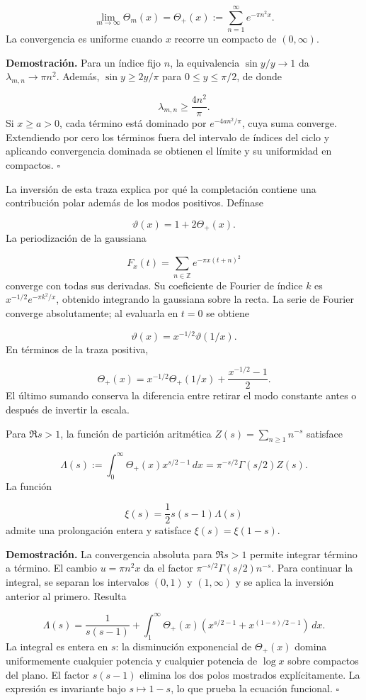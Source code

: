\[
\lim_{m\to\infty}\Theta_m(x)
=\Theta_+(x):=\sum_{n=1}^{\infty}e^{-\pi n^2x}.
\]
La convergencia es uniforme cuando \(x\) recorre un compacto de \((0,\infty)\).

\textbf{Demostración.} Para un índice fijo \(n\), la equivalencia \(\sin y/y\to1\) da \(\lambda_{m,n}\to\pi n^2\). Además, \(\sin y\geq2y/\pi\) para \(0\leq y\leq\pi/2\), de donde

\[
\lambda_{m,n}\geq\frac{4n^2}{\pi}.
\]
Si \(x\geq a>0\), cada término está dominado por \(e^{-4an^2/\pi}\), cuya suma converge. Extendiendo por cero los términos fuera del intervalo de índices del ciclo y aplicando convergencia dominada se obtienen el límite y su uniformidad en compactos. \hfill\(\square\)

La inversión de esta traza explica por qué la completación contiene una contribución polar además de los modos positivos. Defínase

\[
\vartheta(x)=1+2\Theta_+(x).
\]
La periodización de la gaussiana

\[
F_x(t)=\sum_{n\in\mathbb Z}e^{-\pi x(t+n)^2}
\]
converge con todas sus derivadas. Su coeficiente de Fourier de índice \(k\) es \(x^{-1/2}e^{-\pi k^2/x}\), obtenido integrando la gaussiana sobre la recta. La serie de Fourier converge absolutamente; al evaluarla en \(t=0\) se obtiene

\[
\vartheta(x)=x^{-1/2}\vartheta(1/x).
\]
En términos de la traza positiva,

\[
\Theta_+(x)=x^{-1/2}\Theta_+(1/x)+\frac{x^{-1/2}-1}{2}.
\]
El último sumando conserva la diferencia entre retirar el modo constante antes o después de invertir la escala.

Para \(\Re s>1\), la función de partición aritmética \(Z(s)=\sum_{n\geq1}n^{-s}\) satisface

\[
\Lambda(s):=\int_0^\infty\Theta_+(x)x^{s/2-1}\,dx
=\pi^{-s/2}\Gamma(s/2)Z(s).
\]
La función

\[
\xi(s)=\frac12s(s-1)\Lambda(s)
\]
admite una prolongación entera y satisface \(\xi(s)=\xi(1-s)\).

\textbf{Demostración.} La convergencia absoluta para \(\Re s>1\) permite integrar término a término. El cambio \(u=\pi n^2x\) da el factor \(\pi^{-s/2}\Gamma(s/2)n^{-s}\). Para continuar la integral, se separan los intervalos \((0,1)\) y \((1,\infty)\) y se aplica la inversión anterior al primero. Resulta

\[
\Lambda(s)=\frac1{s(s-1)}
+\int_1^\infty\Theta_+(x)
\left(x^{s/2-1}+x^{(1-s)/2-1}\right)\,dx.
\]
La integral es entera en \(s\): la disminución exponencial de \(\Theta_+(x)\) domina uniformemente cualquier potencia y cualquier potencia de \(\log x\) sobre compactos del plano. El factor \(s(s-1)\) elimina los dos polos mostrados explícitamente. La expresión es invariante bajo \(s\mapsto1-s\), lo que prueba la ecuación funcional. \hfill\(\square\)

